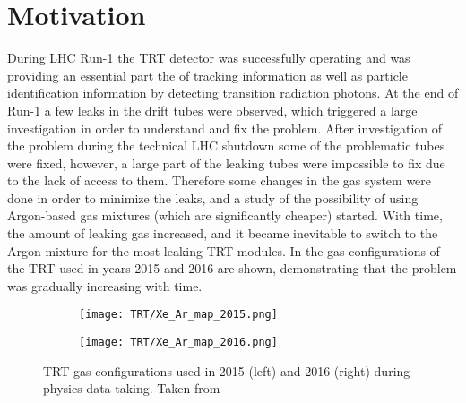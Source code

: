 \section{Motivation}
\label{sec:TRT_intro}

During LHC Run-1 the TRT detector was successfully operating and was providing an essential part the of tracking information 
as well as particle identification information by detecting transition radiation photons.
At the end of Run-1 
a few leaks in the drift tubes were observed, which triggered a large investigation in order to understand and fix the problem. 
After investigation of the problem during the technical LHC shutdown some of the problematic tubes were fixed, however, a large part of the leaking tubes were impossible to fix due to the lack of access to them.
Therefore some changes in the gas system were done in order to minimize the leaks, 
and a study of the possibility of using Argon-based gas mixtures (which are significantly cheaper) started. 
With time, the amount of leaking gas increased, and it became inevitable to switch to the Argon mixture 
for the most leaking TRT modules. In  the gas configurations of the TRT used in years 2015 and 2016 are shown, demonstrating that the problem was gradually increasing with time.

\begin{figure}
\centering
\begin{subfigure}{.5\textwidth}
  \centering
  \texttt{[image: TRT/Xe\_Ar\_map\_2015.png]}
  \label{fig:sub1}
\end{subfigure}%
\begin{subfigure}{.5\textwidth}
  \centering
  \texttt{[image: TRT/Xe\_Ar\_map\_2016.png]}
  \label{fig:sub2}
\end{subfigure}
\caption{TRT gas configurations used in 2015 (left) and 2016 (right) during physics data taking. Taken from~\cite{trt_public_plots_2016}}
\label{fig:mixed_condition_2015_2016}
\end{figure}

